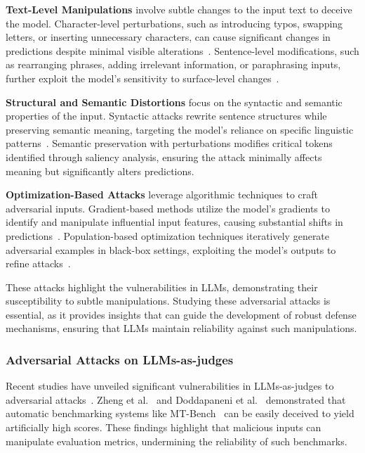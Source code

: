 \textbf{Text-Level Manipulations} involve subtle changes to the input text to deceive the model. Character-level perturbations, such as introducing typos, swapping letters, or inserting unnecessary characters, can cause significant changes in predictions despite minimal visible alterations~\cite{ebrahimi2017hotflip,jiang2023prompt}. Sentence-level modifications, such as rearranging phrases, adding irrelevant information, or paraphrasing inputs, further exploit the model’s sensitivity to surface-level changes~\cite{branch2022evaluating,perez2022ignore}.

\textbf{Structural and Semantic Distortions} focus on the syntactic and semantic properties of the input. Syntactic attacks rewrite sentence structures while preserving semantic meaning, targeting the model’s reliance on specific linguistic patterns~\cite{xu2023llm}. Semantic preservation with perturbations modifies critical tokens identified through saliency analysis, ensuring the attack minimally affects meaning but significantly alters predictions. 

\textbf{Optimization-Based Attacks} leverage algorithmic techniques to craft adversarial inputs. Gradient-based methods utilize the model’s gradients to identify and manipulate influential input features, causing substantial shifts in predictions~\cite{sun2020natural,sun2020adv}. Population-based optimization techniques iteratively generate adversarial examples in black-box settings, exploiting the model’s outputs to refine attacks~\cite{lee2022query}. 

These attacks highlight the vulnerabilities in LLMs, demonstrating their susceptibility to subtle manipulations. Studying these adversarial attacks is essential, as it provides insights that can guide the development of robust defense mechanisms, ensuring that LLMs maintain reliability against such manipulations.




\subsubsection{Adversarial Attacks on LLMs-as-judges}
\label{sec:Adversarial Attacks on LLMs-as-judges}
Recent studies have unveiled significant vulnerabilities in LLMs-as-judges to adversarial attacks~\cite{zheng2024cheating, doddapaneni2024finding, raina2024llm, shi2024optimization}. 
Zheng et al.~\cite{zheng2024cheating} and Doddapaneni et al.~\cite{doddapaneni2024finding} demonstrated that automatic benchmarking systems like MT-Bench~\cite{zheng2023judging} can be easily deceived to yield artificially high scores. These findings highlight that malicious inputs can manipulate evaluation metrics, undermining the reliability of such benchmarks.

